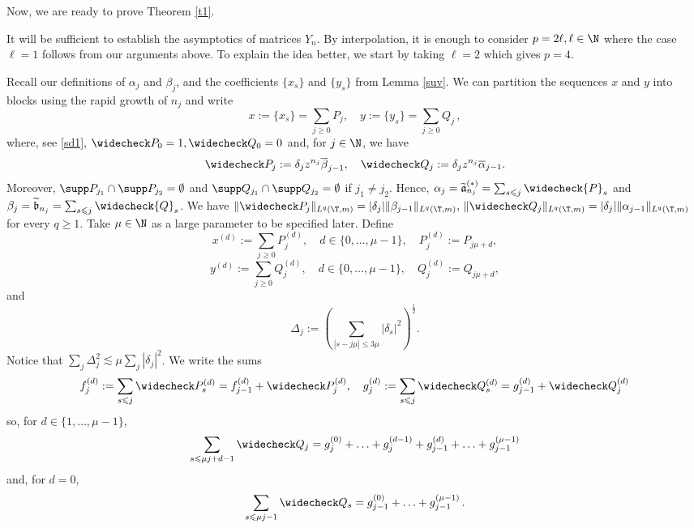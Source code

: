 \documentclass[twoside,a4paper]{amsart}
\def\ge{\geqslant}
\def\le{\leqslant}
\theoremstyle{remark}
\numberwithin{equation}{section}
\begin{document}
Now, we are ready to prove Theorem \ref{t1}.


It  will be sufficient to establish the asymptotics of matrices $Y_n$. By interpolation, it is enough to consider $p=2\ell, \ell\in \N$ where the case $\ell=1$ follows from our arguments above. To explain the idea better, we start by taking $\ell=2$ which gives $p=4$. \smallskip
 
 Recall our definitions of $\alpha_j$ and $\beta_j$, and the coefficients $\{x_s\}$ and $\{y_s\}$ from Lemma \ref{suv}. We can partition the sequences $x$ and $y$ into blocks using the rapid growth of $n_j$ and write
 \[
 x:=\{x_s\}=\sum_{j\ge 0} P_j, \quad y:=\{y_s\}=\sum_{j\ge 0} Q_j\,,
 \]
where, see \eqref{sd1},  $\widecheck P_0=1, \widecheck Q_0=0$ and, for $j\in \N$, we have 
\begin{equation}\label{perh}
\widecheck P_j:=\delta_jz^{n_j}\overline{\beta}_{j-1}, \quad \widecheck Q_j:=\delta_jz^{n_j}\overline{\alpha}_{j-1}.
\end{equation} Moreover,  $\supp P_{j_1}\cap \supp P_{j_2}=\emptyset$ and $\supp Q_{j_1}\cap \supp Q_{j_2}=\emptyset$ if $j_1\neq j_2$. 
Hence, $\alpha_j=\widetilde{\frak{a}}^{(*)}_{n_j}=\sum_{s\le j} \widecheck{P}_s$ and $\beta_j=\widetilde{\frak{b}}_{n_j}=\sum_{s\le j} \widecheck{Q}_s$. We have
 $
 \|\widecheck P_j\|_{L^q(\T,m)}=|\delta_j|\|\beta_{j-1}\|_{L^q(\T,m)}, \, \|\widecheck Q_j\|_{L^q(\T,m)}=|\delta_j|\|\alpha_{j-1}\|_{L^q(\T,m)}
 $
 for every $q\ge 1$.  Take $\mu\in \N$ as a large parameter to be specified later. Define \[x^{(d)}:=\sum_{j\ge 0} P^{(d)}_j,\quad d\in \{0,\ldots,\mu-1\}, \quad P^{(d)}_j:=P_{j\mu+d},\]
 \[y^{(d)}:=\sum_{j\ge 0} Q^{(d)}_j,\quad d\in \{0,\ldots,\mu-1\}, \quad Q^{(d)}_j:=Q_{j\mu+d},\]
 and
 \[
\Delta_j:=\left(\sum_{|s-j\mu|\le 3\mu}|\delta_s|^2\right)^{\tfrac 12}.\]
Notice that $\sum_j\Delta_j^2\lesssim \mu \sum_{j}|\delta_j|^2$. 
We  write the sums
 \begin{equation}\label{pred}
f_j^{(d)}:= \sum_{s\le j}\widecheck P^{(d)}_s=f_{j-1}^{(d)}+\widecheck P^{(d)}_j, \quad g_j^{(d)}:=\sum_{s\le j}\widecheck Q^{(d)}_s=g_{j-1}^{(d)}+\widecheck Q^{(d)}_j
 \end{equation}
 so, for $d\in \{1,\ldots,\mu-1\}$,
 \begin{equation}\label{list1}
 \sum_{s\le \mu j+d-1}\widecheck Q_j=g_j^{(0)}+\ldots+g_j^{(d-1)}+g_{j-1}^{(d)}+\ldots+g_{j-1}^{(\mu-1)}
 \end{equation}
 and, for $d=0$,
 \begin{equation}\label{list2}
 \sum_{s\le \mu j-1}\widecheck Q_s=g_{j-1}^{(0)}+\ldots+g_{j-1}^{(\mu-1)}\,.
 \end{equation}
\end{document}
